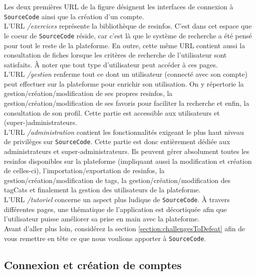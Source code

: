 Les deux premières URL de la figure désignent les interfaces de connexion à \texttt{SourceCode} ainsi que la création d'un compte.\\

L'URL \textit{/exercices} représente la bibliothèque de \glspl{resinfo}. C'est dans cet espace que le coeur de \texttt{SourceCode} réside, car c'est là que le système de recherche a été pensé pour tout le reste de la plateforme. En outre,
cette même URL contient aussi la consultation de \glspl{fiche} lorsque les critères de recherche de l'utilisateur sont satisfaits. À noter que tout type d'utilisateur peut accéder à ces pages.\\

L'URL \textit{/gestion} renferme tout ce dont un utilisateur (connecté avec son compte) peut effectuer sur la plateforme pour enrichir son utilisation. On y répertorie la gestion/création/modification de ses propres \glspl{resinfo}, la gestion/création/modification de ses favoris pour faciliter la recherche et enfin, la consultation de son profil. Cette partie est accessible aux utilisateurs et (super-)administrateurs.\\

L'URL \textit{/administration} contient les fonctionnalités exigeant le plus haut niveau de privilèges sur \texttt{SourceCode}. Cette partie est donc entièrement dédiée aux administrateurs et super-administrateurs. Ils peuvent gérer absolument toutes les \glspl{resinfo} disponibles sur la plateforme (impliquant aussi la modification et création de celles-ci), l'importation/exportation de \glspl{resinfo}, la gestion/création/modification de \glspl{tag}, la gestion/création/modification des \glspl{tagCat} et finalement la gestion des utilisateurs de la plateforme.\\

L'URL \textit{/tutoriel} concerne un aspect plus ludique de \texttt{SourceCode}. À travers différentes pages, une thématique de l'application est décortiquée afin que l'utilisateur puisse améliorer sa prise en main avec la plateforme.\\

Avant d'aller plus loin, considérez la section \ref{section:challengesToDefeat} afin de vous remettre en tête ce que nous voulions apporter à \texttt{SourceCode}.

\subsection{Connexion et création de comptes}

